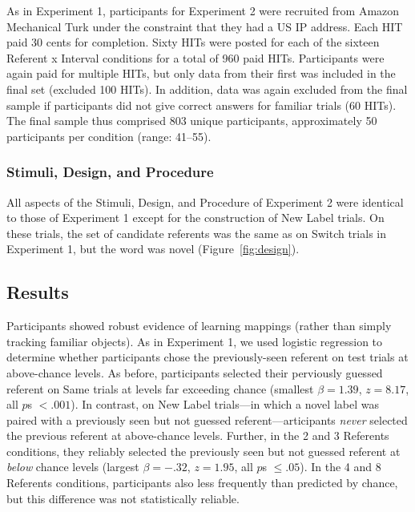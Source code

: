 \documentclass[man,floatsintext]{apa6}
\begin{document}
As in Experiment 1, participants for Experiment 2 were recruited from Amazon Mechanical Turk under the constraint that they had a US IP address. Each HIT paid 30 cents for completion. Sixty HITs were posted for each of the sixteen Referent x Interval conditions for a total of 960 paid HITs. Participants were again paid for multiple HITs, but only data from their first was included in the final set (excluded 100 HITs). In addition, data was again excluded from the final sample if participants did not give correct answers for familiar trials (60 HITs). The final sample thus comprised 803 unique participants, approximately 50 participants per condition (range: 41--55).

\subsubsection{Stimuli, Design, and Procedure}

All aspects of the Stimuli, Design, and Procedure of Experiment 2 were identical to those of Experiment 1 except for the construction of New Label trials. On these trials, the set of candidate referents was the same as on Switch trials in Experiment 1, but the word was novel (Figure~\ref{fig:design}).


\subsection{Results}

Participants showed robust evidence of learning mappings (rather than simply tracking familiar objects). As in Experiment 1, we used logistic regression to determine whether participants chose the previously-seen referent on test trials at above-chance levels. As before, participants selected their perviously guessed referent on Same trials at levels far exceeding chance (smallest $\beta =  1.39$, $z=8.17$, all $p$s $< .001$). In contrast, on New Label trials---in which a novel label was paired with a previously seen but not guessed referent---articipants \emph{never} selected the previous referent at above-chance levels. Further, in the 2 and 3 Referents conditions, they reliably selected the previously seen but not guessed referent at \emph{below} chance levels (largest $\beta =  -.32$, $z=1.95$, all $p$s $\leq .05$). In the 4 and 8 Referents conditions, participants also less frequently than predicted by chance, but this difference was not statistically reliable.
\end{document}
